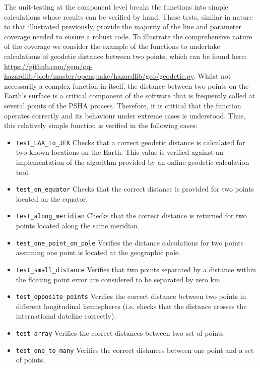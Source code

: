 The unit-testing at the component level breaks the functions into simple
calculations whose results can be verified by hand. 
These tests, similar in nature to that illustrated previously, provide 
the majority of the line and parameter coverage needed to ensure a 
robust code. To illustrate the comprehensive nature of the coverage 
we consider the example of the functions to undertake calculations of
geodetic distance between two points, which can be found here: 
\href{https://github.com/gem/oq-hazardlib/blob/master/openquake/hazardlib/geo/geodetic.py}{https://github.com/gem/oq-hazardlib/blob/master/openquake/hazardlib/geo/geodetic.py}. 
Whilst not necessarily a complex function in itself, the distance 
between two points on the Earth's surface is a critical component 
of the software that is frequently called at several points of the
PSHA process. Therefore, it is critical that the function operates 
correctly and its behaviour under extreme cases is understood. 
Thus, this relatively simple function is verified in the following cases:

\begin{itemize}
\item \verb=test_LAX_to_JFK= Checks that a correct geodetic distance is calculated for two known locations on the Earth. This value is verified against an implementation of the algorithm provided by an online geodetic calculation tool.
\item \verb=test_on_equator= Checks that the correct distance is provided for two points located on the equator.
\item \verb=test_along_meridian= Checks that the correct distance is returned for two points located along the same meridian.
\item \verb=test_one_point_on_pole= Verifies the distance calculations for two points assuming one point is located at the geographic pole.
\item \verb=test_small_distance= Verifies that two points separated by a distance within the floating point error are considered to be separated by zero km
\item \verb=test_opposite_points= Verifies the correct distance between two points in different longitudinal hemispheres (i.e. checks that the distance crosses the international dateline correctly).
\item \verb=test_array= Verifies the correct distances between two set of points
\item \verb=test_one_to_many= Verifies the correct distances between one point and a set of points.
\end{itemize}

